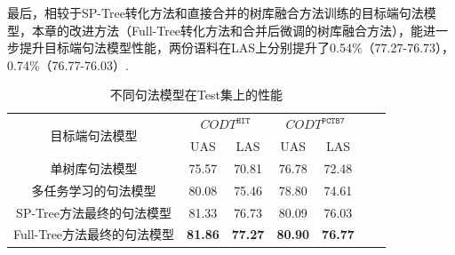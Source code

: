 最后，相较于SP-Tree转化方法和直接合并的树库融合方法训练的目标端句法模型，本章的改进方法（Full-Tree转化方法和合并后微调的树库融合方法），能进一步提升目标端句法模型性能，两份语料在LAS上分别提升了0.54\%（77.27-76.73），0.74\%（76.77-76.03）. %

\begin{table}[hb!]
    \addtolength{\tabcolsep}{+1.0mm}
    \centering
    \caption{不同句法模型在Test集上的性能}
    \label{tb:Test-results-diff-parsers}
    \begin{tabular}{c ccc ccc}
        \toprule
        \multirow{2}{*}{目标端句法模型} & \multicolumn{2}{c}{$CODT^{\texttt{HIT}}$} & \multicolumn{2}{c}{$CODT^{\texttt{PCTB7}}$}                       \\
        \cmidrule(lr){2-3}
        \cmidrule(lr){4-5}
                                        & UAS                                       & LAS                                         & UAS      & LAS      \\
        \midrule
        单树库句法模型                  & 75.57                                     & 70.81                                       & 76.78    & 72.48    \\
        多任务学习的句法模型            & 80.08                                     & 75.46                                       & 78.80    & 74.61    \\
        SP-Tree方法最终的句法模型       & 81.33                                     & 76.73                                       & 80.09    & 76.03    \\
        Full-Tree方法最终的句法模型     & \bf81.86                                  & \bf77.27                                    & \bf80.90 & \bf76.77 \\
        \bottomrule
    \end{tabular}

\end{table}

